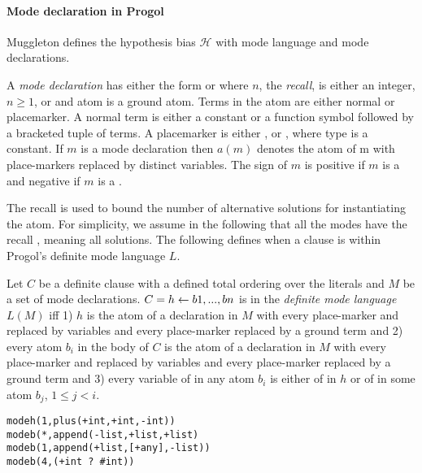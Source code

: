 \paragraph{Mode declaration in Progol}
Muggleton defines the hypothesis bias $\mathcal{H}$ with mode language and mode declarations.
\begin{defn}\cite{muggleton1995inverse}
A \emph{mode declaration} has either the form
 or  where $n$, the \emph{recall}, is either an integer, $n \ge 1$,
or \tc{*} and atom is a ground atom. Terms in the atom are either normal or placemarker. A normal term is either a constant or a function symbol followed by a
bracketed tuple of terms. A placemarker is either ,  or , where
type is a constant. If $m$ is a mode declaration then $a(m)$ denotes the atom of m
with place-markers replaced by distinct variables. The sign of $m$ is positive if $m$
is a  and negative if $m$ is a .
\end{defn}

The recall is used to bound the number of alternative solutions for instantiating
the atom. For simplicity, we assume in the following that all the modes have the
recall \tc{*}, meaning all solutions. The following defines when a clause is within Progol's definite mode language $L$.

\begin{defn}\label{definition_definite_mode_language}\cite{muggleton1995inverse}
Let $C$ be a definite clause with a
defined total ordering over the literals and $M$ be a set of mode declarations.
$C = h \leftarrow b1, ..., bn$ is in the \emph{definite mode language} $L(M)$ iff 1) $h$ is the atom
of a  declaration in $M$ with every place-marker  and  replaced by
variables and every place-marker  replaced by a ground term and 2) every
atom $b_i$ in the body of $C$ is the atom of a  declaration in $M$ with every
place-marker  and  replaced by variables and every place-marker 
replaced by a ground term and 3) every variable of  in any atom $b_i$ is either
of  in $h$ or of  in some atom $b_j$, $1 \le j < i$.
\end{defn}

\begin{exmp}\cite{muggleton1995inverse}
\begin{lstlisting}
modeh(1,plus(+int,+int,-int))
modeb(*,append(-list,+list,+list)
modeb(1,append(+list,[+any],-list))
modeb(4,(+int ? #int))
\end{lstlisting}
\end{exmp}

